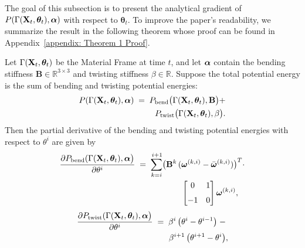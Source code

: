 The goal of this subsection is to present the analytical gradient of $P(\Gamma(\mathbf{X}_t, \bm{\theta}_t), \bm{\alpha})$ with respect to $\bm{\theta}_t$. 
To improve the paper’s readability, we summarize the result in the following theorem whose proof can be found in Appendix~\ref{appendix: Theorem 1 Proof}.
\begin{thm}
\label{thm:potential_energy_gradient}
Let $\Gamma(\mathbf{X}_t, \bm{\theta}_t)$ be the Material Frame at time $t$, and let 
$\bm{\alpha}$ contain the bending stiffness $\mathbf{B} \in \mathbb{R}^{3\times3} $ and twisting stiffness $\beta \in \mathbb{R}$. 
Suppose the total potential energy is the sum of bending and twisting potential energies:
\begin{equation}
\begin{split}
  P(\Gamma(\mathbf{X}_t, \bm{\theta}_t), \bm{\alpha}) 
  \;=\; P_\text{bend}\bigl(\Gamma(\mathbf{X}_t, \bm{\theta}_t), \mathbf{B}\bigr) + \\
     P_\text{twist}\bigl(\Gamma(\mathbf{X}_t, \bm{\theta}_t), \beta\bigr).
  \label{eq:potentialP}
\end{split}
\end{equation}
Then the partial derivative of the bending and twisting potential energies with respect to $\theta^i$ are given by
\begin{align}
    \begin{split}
  \frac{\partial P_{\mathrm{bend}}(\Gamma(\mathbf{X}_t, \bm{\theta}_t), \bm{\alpha}\bigr)}{\partial \theta^i}
  \;=\; 
  \sum_{k=i}^{\,i+1}
  \bigl(\mathbf{B}^k\, (&\bm{\omega}^{(k,i)}  - \bar{\bm{\omega}}^{(k,i)})\bigr)^{T}
  \cdot \\
    &\begin{bmatrix}0 & 1\\[6pt]-1 & 0\end{bmatrix}
  \bm{\omega}^{(k,i)},
      \end{split}
  \label{eq:potentialbendgradient_paper}
\end{align}
\begin{equation}
\begin{split}
  \frac{\partial P_{\mathrm{twist}}(\Gamma(\mathbf{X}_t, \bm{\theta}_t), \bm{\alpha}\bigr)}{\partial \theta^i}
  \;=\;
  \beta^i \,\bigl(\theta^i - \theta^{i-1}\bigr)\;-\;
  \\ 
  \beta^{i+1}\,\bigl(\theta^{i+1} - \theta^i\bigr),
  \label{eq:potentialtwistgradient_paper}
  \end{split}
\end{equation}

\end{thm}
